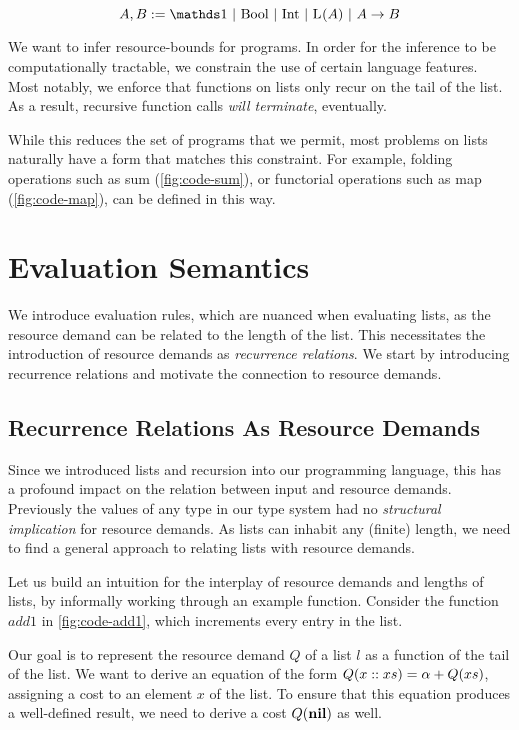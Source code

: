 \begin{definition}\label{def:type-system-6}
   \[
      A, B := \unit~|~\text{\bool}~|~\text{\typeint}~|~\ralist{}{A}~|~\rafunc{A}{B}{}{}
   \]
\end{definition}

We want to infer resource-bounds for programs. In order for the inference to be computationally tractable, we constrain the use of certain language features. Most notably, we enforce that functions on lists only recur on the tail of the list. As a result, recursive function calls \emph{will terminate}, eventually.

While this reduces the set of programs that we permit, most problems on lists naturally have a form that matches this constraint. For example, folding operations such as sum (\cref{fig:code-sum}), or functorial operations such as map (\cref{fig:code-map}), can be defined in this way. 


\section{Evaluation Semantics}

We introduce evaluation rules, which are nuanced when evaluating lists, as the resource demand can be related to the length of the list. This necessitates the introduction of resource demands as \emph{recurrence relations}. We start by introducing recurrence relations and motivate the connection to resource demands. 

\subsection{Recurrence Relations As Resource Demands}

Since we introduced lists and recursion into our programming language, this has a profound impact on the relation between input and resource demands. Previously the values of any type in our type system had no \emph{structural implication} for resource demands. As lists can inhabit any (finite) length, we need to find a general approach to relating lists with resource demands. 

Let us build an intuition for the interplay of resource demands and lengths of lists, by informally working through an example function. Consider the function \(add1\) in \cref{fig:code-add1}, which increments every entry in the list.

Our goal is to represent the resource demand \(Q\) of a list \(l\) as a function of the tail of the list. We want to derive an equation of the form \(Q(x :: xs) = \alpha + Q(xs)\), assigning a cost to an element \(x\) of the list. To ensure that this equation produces a well-defined result, we need to derive a cost \(Q(\textbf{nil})\) as well.

